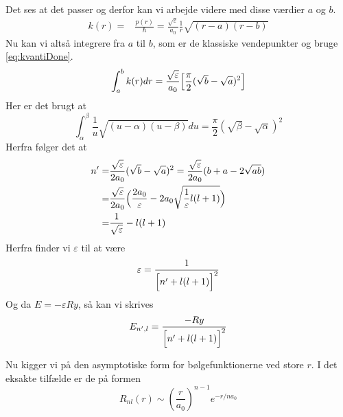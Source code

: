 Det ses at det passer og derfor kan vi arbejde videre med disse værdier $a$ og $b$.
\begin{align}
  k(r) = & \frac{p(r)}{\hbar} = \frac{\sqrt{\varepsilon}}{a_0}\frac{1}{r}\sqrt{(r-a)(r-b)}
\end{align}
Nu kan vi altså integrere fra $a$ til $b$, som er de klassiske vendepunkter og bruge \cref{eq:kvantiDone}.
\begin{equation}
  \int_{a}^{b}k(r)dr = \frac{\sqrt{\varepsilon}}{a_0} \Bigl[\frac{\pi}{2}(\sqrt{b}-\sqrt{a})^2  \Bigr]
\end{equation}
Her er det brugt at
\begin{equation}
  \int_{\alpha}^{\beta}\frac{1}{u}\sqrt{(u-\alpha)(u-\beta)}du = \frac{\pi}{2}(\sqrt{\beta}-\sqrt{\alpha})^2
\end{equation}
Herfra følger det at
\begin{align}
  n' = & \frac{\sqrt{\varepsilon}}{2a_0}(\sqrt{b}-\sqrt{a})^2 = \frac{\sqrt{\varepsilon}}{2a_0}(b+a-2\sqrt{ab})\\
     = & \frac{\sqrt{\varepsilon}}{2a_0}\Bigl(\frac{2a_0}{\varepsilon}-2a_0\sqrt{\frac{1}{\varepsilon}l(l+1)}\Bigr)\\
     = & \frac{1}{\sqrt{\varepsilon}} -l(l+1)
\end{align}
Herfra finder vi $\varepsilon$ til at være
\begin{equation}
  \varepsilon = \frac{1}{\Bigl[n'+l(l+1)  \Bigr]^2}
\end{equation}
Og da $E = -\varepsilon Ry$, så kan vi skrives
\begin{equation}
  E_{n',l} = \frac{-Ry}{\Bigl[n'+l(l+1)  \Bigr]^2}
\end{equation}

Nu kigger vi på den asymptotiske form for bølgefunktionerne ved store $r$.
I det eksakte tilfælde er de på formen
\begin{equation}
  R_{nl}(r) \sim \left(\frac{r}{a_0}\right)^{n-1}e^{-r/na_0}
  \label{eq:eksatR}
\end{equation}

